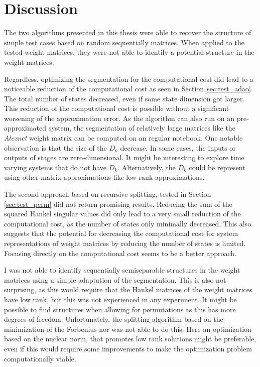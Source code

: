 \documentclass[doctype=mastersthesis,BCOR=15mm,biblatex]{ldvbook}%
\begin{document}
\chapter{Discussion}\label{chap:discussion}
The two algorithms presented in this thesis were able to recover the structure of simple test cases based on random sequentially matrices.
When applied to the tested weight matrices, they were not able to identify a potential structure in the weight matrices.

Regardless, optimizing the segmentation for the computational cost did lead to a noticeable reduction of the computational cost as seen in Section\,\ref{sec:test_adao}.
The total number of states decreased, even if some state dimension got larger. 
This reduction of the computational cost is possible without a significant worsening of the approximation error. 
As the algorithm can also run on an pre-approximated system, the segmentation of relatively large matrices like the \emph{Alexnet} weight matrix can be computed on an regular notebook.
One notable observation is that the size of the $D_k$ decrease.
In some cases, the inputs or outputs of stages are zero-dimensional.
It might be interesting to explore time varying systems that do not have $D_k$.
Alternatively, the $D_k$ could be represent using other matrix approximations like low rank approximations. 

The second approach based on recursive splitting, tested in Section\,\ref{sec:test_perm} did not return promising results.
Reducing the sum of the squared Hankel singular values did only lead to a very small reduction of the computational cost, as the number of states only minimally decreased.
This also suggests that the potential for decreasing the computational cost for system representations of weight matrices by reducing the number of states is limited.
Focusing directly on the computational cost seems to be a better approach.

I was not able to identify sequentially semiseparable structures in the weight matrices using a simple adaptation of the segmentation.
This is also not surprising, as this would require that the Hankel matrices of the weight matrices have low rank, but this was not experienced in any experiment.
It might be possible to find structures when allowing for permutations as this has more degrees of freedom. 
Unfortunately, the splitting algorithm based on the minimization of the Forbenius nor was not able to do this.
Here an optimization based on the nuclear norm, that promotes low rank solutions might be preferable, even if this would require some improvements to make the optimization problem computationally viable.
\end{document}
